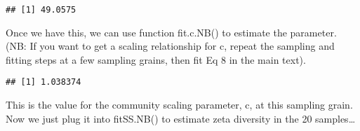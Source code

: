 \documentclass[
]{article}
\newenvironment{Shaded}{\begin{snugshade}}{\end{snugshade}}
\newcommand{\AttributeTok}[1]{\textcolor[rgb]{0.77,0.63,0.00}{#1}}
\newcommand{\CommentTok}[1]{\textcolor[rgb]{0.56,0.35,0.01}{\textit{#1}}}
\newcommand{\DecValTok}[1]{\textcolor[rgb]{0.00,0.00,0.81}{#1}}
\newcommand{\FunctionTok}[1]{\textcolor[rgb]{0.00,0.00,0.00}{#1}}
\newcommand{\NormalTok}[1]{#1}
\newcommand{\OtherTok}[1]{\textcolor[rgb]{0.56,0.35,0.01}{#1}}
\newcommand{\SpecialCharTok}[1]{\textcolor[rgb]{0.00,0.00,0.00}{#1}}
\begin{document}
\begin{Shaded}
\end{Shaded}

\begin{verbatim}
## [1] 49.0575
\end{verbatim}

Once we have this, we can use function fit.c.NB() to estimate the
parameter. (NB: If you want to get a scaling relationship for c, repeat
the sampling and fitting steps at a few sampling grains, then fit Eq 8
in the main text).

\begin{Shaded}
\end{Shaded}

\begin{verbatim}
## [1] 1.038374
\end{verbatim}

This is the value for the community scaling parameter, c, at this
sampling grain. Now we just plug it into fitSS.NB() to estimate zeta
diversity in the 20 samples\ldots{}

\begin{Shaded}
\end{Shaded}
\end{document}
